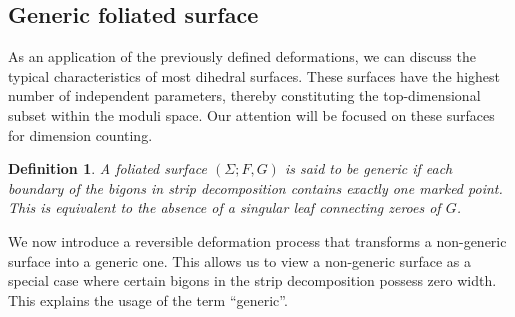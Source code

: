 \documentclass[pdflatex,sn-mathphys]{sn-jnl}%
\numberwithin{equation}{section}
\theoremstyle{thmstyleone}%
\newtheorem{definition}[theorem]{Definition}
\newcommand{\DEF}{\emph}
\begin{document}
\subsection{Generic foliated surface}\label{sec:generic}
As an application of the previously defined deformations, we can discuss the typical characteristics of most dihedral surfaces. These surfaces have the highest number of independent parameters, thereby constituting the top-dimensional subset within the moduli space. Our attention will be focused on these surfaces for dimension counting.
\begin{definition}\label{def:generic_foliated}
        A foliated surface $(\Sigma;F,G)$ is said to be \DEF{generic} if each boundary of the bigons in strip decomposition contains exactly one marked point.
        This is equivalent to the absence of a singular leaf connecting zeroes of $G$.
\end{definition}

We now introduce a reversible deformation process that transforms a non-generic surface into a generic one. This allows us to view a non-generic surface as a special case where certain bigons in the strip decomposition possess zero width. This explains the usage of the term “generic”.
\end{document}
